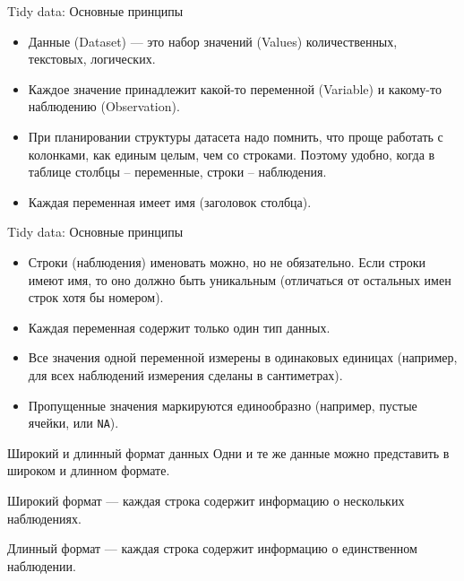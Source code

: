 \documentclass[
  10pt,
  ignorenonframetext,
  aspectratio=169,t,xcolor=table]{beamer}
\providecommand{\tightlist}{%
  \setlength{\itemsep}{0pt}\setlength{\parskip}{0pt}}
\begin{document}
\begin{frame}{Tidy data: Основные принципы}
\protect\hypertarget{tidy-data-ux43eux441ux43dux43eux432ux43dux44bux435-ux43fux440ux438ux43dux446ux438ux43fux44b}{}
\begin{itemize}
\tightlist
\item
  Данные (Dataset) --- это набор значений (Values) количественных,
  текстовых, логических.
\item
  Каждое значение принадлежит какой-то переменной (Variable) и какому-то
  наблюдению (Observation).
\item
  При планировании структуры датасета надо помнить, что проще работать с
  колонками, как единым целым, чем со строками. Поэтому удобно, когда в
  таблице столбцы -- переменные, строки -- наблюдения.
\item
  Каждая переменная имеет имя (заголовок столбца).
\end{itemize}
\end{frame}

\begin{frame}[fragile]{Tidy data: Основные принципы}
\protect\hypertarget{tidy-data-ux43eux441ux43dux43eux432ux43dux44bux435-ux43fux440ux438ux43dux446ux438ux43fux44b-1}{}
\begin{itemize}
\tightlist
\item
  Строки (наблюдения) именовать можно, но не обязательно. Если строки
  имеют имя, то оно должно быть уникальным (отличаться от остальных имен
  строк хотя бы номером).
\item
  Каждая переменная содержит только один тип данных.
\item
  Все значения одной переменной измерены в одинаковых единицах
  (например, для всех наблюдений измерения сделаны в сантиметрах).
\item
  Пропущенные значения маркируются единообразно (например, пустые
  ячейки, или \texttt{NA}).
\end{itemize}
\end{frame}

\begin{frame}{Широкий и длинный формат данных}
\protect\hypertarget{ux448ux438ux440ux43eux43aux438ux439-ux438-ux434ux43bux438ux43dux43dux44bux439-ux444ux43eux440ux43cux430ux442-ux434ux430ux43dux43dux44bux445}{}
Одни и те же данные можно представить в широком и длинном формате.

Широкий формат --- каждая строка содержит информацию о нескольких
наблюдениях.

Длинный формат --- каждая строка содержит информацию о единственном
наблюдении.
\end{frame}
\end{document}
